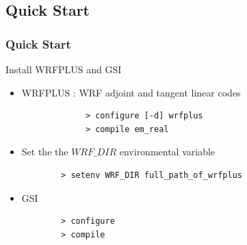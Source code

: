 \documentclass[10pt]{beamer}
\begin{document}

\subsection{Quick Start}
\begin{frame}[fragile]
\frametitle{Quick Start}
Install WRFPLUS and GSI
   \begin{itemize}
        	\item WRFPLUS : WRF adjoint and tangent linear codes
		\begin{verbatim}
	         > configure [-d] wrfplus
	         > compile em_real
	         \end{verbatim}
	\item Set the the $WRF\_DIR$ environmental variable
		\begin{verbatim} 
		> setenv WRF_DIR full_path_of_wrfplus  
		\end{verbatim}
	\item GSI
		\begin{verbatim}
		> configure
		> compile
		\end{verbatim}
    \end{itemize}
\end{frame}
\end{document}
